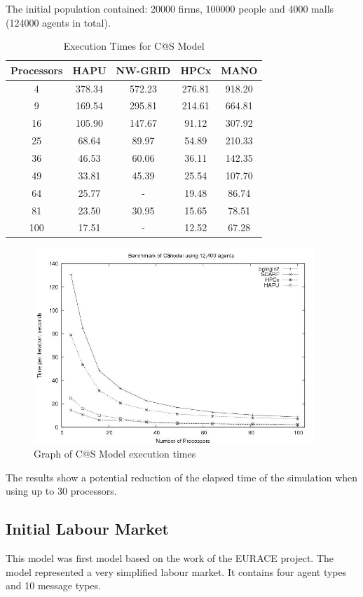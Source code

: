 The initial population contained: 20000 firms, 100000 people and 4000 malls (124000 agents in total).
{
\renewcommand{\arraystretch}{1.25}
\begin{table}[ht]
	\centering
		\begin{tabular}{c|cccc}
		Processors	&HAPU		&NW-GRID	&HPCx		&MANO		\\ \hline
		4 					&378.34	&572.23		&276.81	&918.20	\\
		9 					&169.54	&295.81		&214.61	&664.81	\\
		16 					&105.90	&147.67		&91.12	&307.92	\\
		25 					&68.64	&89.97		&54.89	&210.33	\\
		36 					&46.53	&60.06		&36.11	&142.35	\\
		49 					&33.81	&45.39		&25.54	&107.70	\\
		64 					&25.77	&-				&19.48	&86.74	\\
		81 					&23.50	&30.95		&15.65	&78.51	\\
		100 				&17.51	&-				&12.52	&67.28	\\
	\end{tabular}
	\caption{Execution Times for C@S Model}
	\label{tab:ExecutionTimesForC@S}
\end{table}
}
\bigskip
\begin{figure}[ht]
	\centering
		\includegraphics[width=300pt]{C@S-graph.jpg}
	\caption{Graph of C@S Model execution times}
	\label{fig:C@S-graph}
\end{figure}
The results show a potential reduction of the elapsed time of the simulation when using up to 30 processors.



\subsection{Initial Labour Market}
This model was first model based on the work of the EURACE project. The model represented a very simplified labour market. It contains four agent types and 10 message types.

